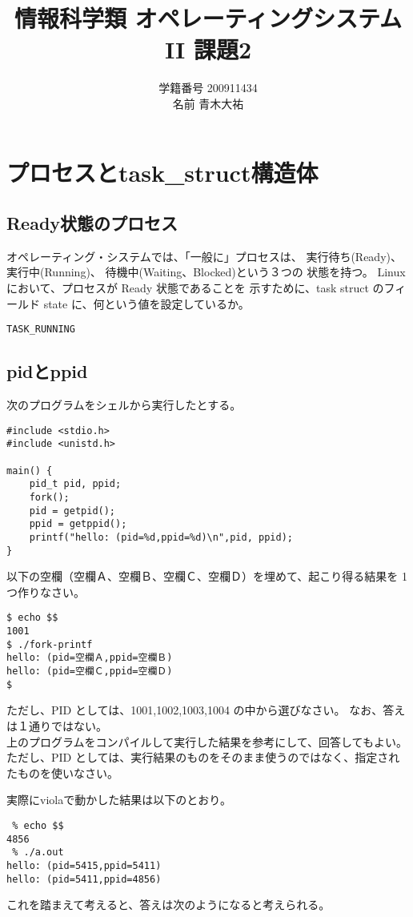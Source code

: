 \documentclass[a4j,9pt]{jsarticle}
\title{情報科学類 オペレーティングシステムII 課題2}
\author{学籍番号 200911434 \\ 名前 青木大祐}
\begin{document}
\maketitle
\setcounter{section}{1}
\section{プロセスとtask\_struct構造体}
\setcounter{subsection}{200}
\subsection{Ready状態のプロセス}
\begin{screen}
オペレーティング・システムでは、「一般に」プロセスは、 実行待ち(Ready)、
 実行中(Running)、 待機中(Waiting、Blocked)という３つの 状態を持つ。
 Linux において、プロセスが Ready 状態であることを 示すために、task
 struct のフィールド state に、何という値を設定しているか。

\end{screen}

{\tt{TASK\_RUNNING}}

\subsection{pidとppid}
\begin{screen}
 次のプログラムをシェルから実行したとする。
\begin{lstlisting}
#include <stdio.h>
#include <unistd.h>

main() {
    pid_t pid, ppid;
    fork();
    pid = getpid();
    ppid = getppid();
    printf("hello: (pid=%d,ppid=%d)\n",pid, ppid);
}
\end{lstlisting}

以下の空欄（空欄Ａ、空欄Ｂ、空欄Ｃ、空欄Ｄ）を埋めて、起こり得る結果を 1
 つ作りなさい。

\begin{lstlisting}
$ echo $$ 
1001
$ ./fork-printf  
hello: (pid=空欄Ａ,ppid=空欄Ｂ)
hello: (pid=空欄Ｃ,ppid=空欄Ｄ)
$ 
\end{lstlisting}
ただし、PID としては、1001,1002,1003,1004 の中から選びなさい。 なお、答えは１通りではない。\\
上のプログラムをコンパイルして実行した結果を参考にして、回答してもよい。 ただし、PID としては、実行結果のものをそのまま使うのではなく、指定され たものを使いなさい。
\end{screen}
実際にviolaで動かした結果は以下のとおり。
\begin{lstlisting}
 % echo $$
4856
 % ./a.out   
hello: (pid=5415,ppid=5411)
hello: (pid=5411,ppid=4856)
\end{lstlisting}
これを踏まえて考えると、答えは次のようになると考えられる。
\end{document}
